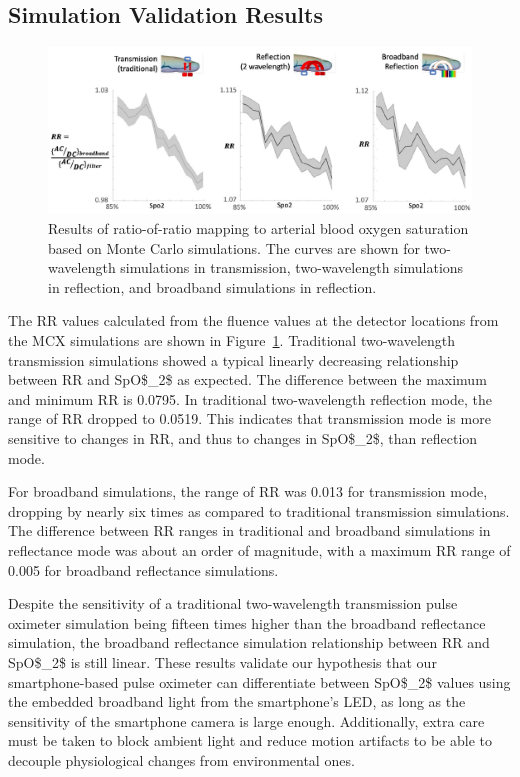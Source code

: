 \subsection{Simulation Validation Results}
\begin{figure}
    \begin{center}
    \includegraphics[width=\textwidth]{fig/moxi/D3RR.pdf}
    \end{center}
    \caption{Results of ratio-of-ratio mapping to arterial blood oxygen saturation based on Monte Carlo simulations. The curves are shown for two-wavelength simulations in transmission, two-wavelength simulations in reflection, and broadband simulations in reflection.} 
    \label{fig:D3RR}
\end{figure}
The \ac{RR} values calculated from the fluence values at the detector locations from the \ac{MCX} simulations are shown in Figure~\ref{fig:D3RR}. Traditional two-wavelength transmission simulations showed a typical linearly decreasing relationship between \ac{RR} and \ac{SpO$_2$} as expected. The difference between the maximum and minimum \ac{RR} is 0.0795. In traditional two-wavelength reflection mode, the range of \ac{RR} dropped to 0.0519. This indicates that transmission mode is more sensitive to changes in \ac{RR}, and thus to changes in \ac{SpO$_2$}, than reflection mode. 

For broadband simulations, the range of \ac{RR} was 0.013 for transmission mode, dropping by nearly six times as compared to traditional transmission simulations. The difference between \ac{RR} ranges in traditional and broadband simulations in reflectance mode was about an order of magnitude, with a maximum \ac{RR} range of 0.005 for broadband reflectance simulations. 

Despite the sensitivity of a traditional two-wavelength transmission pulse oximeter simulation being fifteen times higher than the broadband reflectance simulation, the broadband reflectance simulation relationship between \ac{RR} and \ac{SpO$_2$} is still linear. These results validate our hypothesis that our smartphone-based pulse oximeter can differentiate between \ac{SpO$_2$} values using the embedded broadband light from the smartphone's \ac{LED}, as long as the sensitivity of the smartphone camera is large enough. Additionally, extra care must be taken to block ambient light and reduce motion artifacts to be able to decouple physiological changes from environmental ones. 

